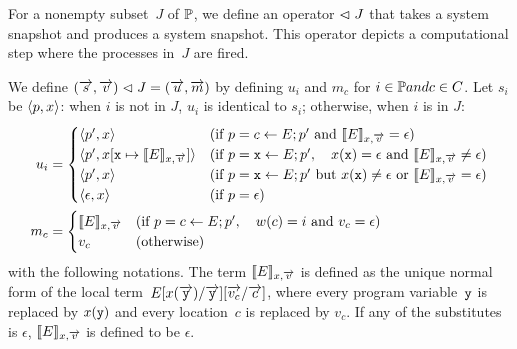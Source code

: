 For a nonempty subset~$J$ of $\mathbb{P}$, we define an operator $\vartriangleleft J$ that
takes a system snapshot and produces a system snapshot.
This operator depicts a computational step where the processes in~$J$
are fired.

We define $
(\overrightarrow s, \overrightarrow v) \vartriangleleft J = (\overrightarrow u, \overrightarrow m)
$ by defining $u_i$ and $m_c$ for $i\in\mathbb{P} and c \in C$.
Let $s_i$ be $\langle{p,x}\rangle$:
when $i$ is not in $J$, $u_i$ is identical to $s_i$; otherwise, when $i$
is in $J$:
\begin{align*}
 u_i & =
   \begin{cases}
    \langle{p',x}\rangle  & (\text{if } p = c
    \leftarrow E; p' \text{ and }\llbracket{E}\rrbracket_{x,\overrightarrow v} = \epsilon)
    \\
    \langle{p', x[\texttt{x} \mapsto \llbracket{E}\rrbracket_{x, \overrightarrow v}]}\rangle&
    (\text{if } p = \texttt{x} \leftarrow E; p', \quad
    x(\texttt{x}) = \epsilon  \text{ and } \llbracket{E}\rrbracket_{x, \overrightarrow v} \neq \epsilon)
    \\
    \langle{p', x}\rangle & (\text{if } p = \texttt{x} \leftarrow E; p' \text{
    but } x(\texttt{x})\neq \epsilon \text{ or }\llbracket{E}\rrbracket_{x,\overrightarrow v} = \epsilon
    ) \\
    \langle{\epsilon, x}\rangle & (\text{if } p = \epsilon)
   \end{cases}\\
 m_c & =
   \begin{cases}
   \llbracket{E}\rrbracket_{x, \overrightarrow v} & (\text{if } p = c \leftarrow E; p',\quad w(c)= i
    \text{
   and } v_c = \epsilon) \\
   v_c &(\text{otherwise})
   \end{cases}\\
\end{align*}
with the following notations.
The term
$\llbracket{E}\rrbracket_{x, \overrightarrow v}$ is defined as the unique normal form
of the local term~$E[x(\overrightarrow{\texttt{y}}) / \overrightarrow{\texttt{y}}][\overrightarrow{v_c}/\overrightarrow c]$, where
every program variable~$\texttt{y}$ is replaced by $x(\texttt{y})$
and every location~$c$ is replaced by $v_c$.
If any of the substitutes is $\epsilon$,
$\llbracket{E}\rrbracket_{x, \overrightarrow v}$ is defined to be $\epsilon$.

